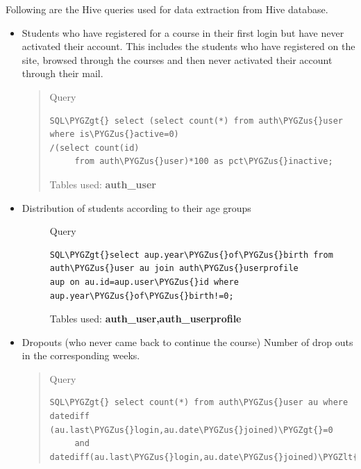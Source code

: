\documentclass[a4paper,12pt,oneside]{sphinxmanual}
\def\PYGZus{\char`\_}
\def\PYGZlt{\char`\<}
\def\PYGZgt{\char`\>}
\begin{document}
Following are the Hive queries used for data extraction from Hive database.
\begin{itemize}
\item {} 
Students who have registered for a course in their first login but have never activated their account.
This includes the students who have registered on the site, browsed through the courses and then never activated their account through their mail.
\begin{quote}

Query

\begin{Verbatim}[commandchars=\\\{\}]
SQL\PYGZgt{} select (select count(*) from auth\PYGZus{}user where is\PYGZus{}active=0)
/(select count(id)
     from auth\PYGZus{}user)*100 as pct\PYGZus{}inactive;
\end{Verbatim}

Tables used: \textbf{auth\_user}
\end{quote}

\item {} \begin{description}
\item[{Distribution of students according to their age groups}] \leavevmode
Query

\begin{Verbatim}[commandchars=\\\{\}]
SQL\PYGZgt{}select aup.year\PYGZus{}of\PYGZus{}birth from auth\PYGZus{}user au join auth\PYGZus{}userprofile
aup on au.id=aup.user\PYGZus{}id where aup.year\PYGZus{}of\PYGZus{}birth!=0;
\end{Verbatim}

Tables used: \textbf{auth\_user,auth\_userprofile}

\end{description}

\item {} 
Dropouts (who never came back to continue the course)
Number of drop outs in the corresponding weeks.
\begin{quote}

Query

\begin{Verbatim}[commandchars=\\\{\}]
SQL\PYGZgt{} select count(*) from auth\PYGZus{}user au where datediff
(au.last\PYGZus{}login,au.date\PYGZus{}joined)\PYGZgt{}=0
     and datediff(au.last\PYGZus{}login,au.date\PYGZus{}joined)\PYGZlt{}7;
\end{Verbatim}


\end{quote}
\end{itemize}
\end{document}
